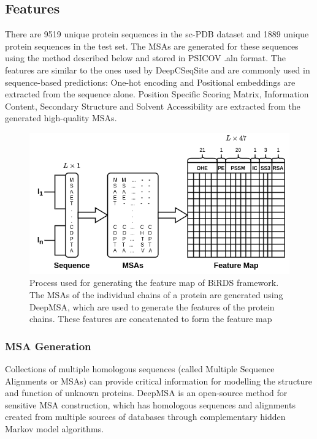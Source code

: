 \documentclass[journal=jcisd8,manuscript=article]{achemso}
\begin{document}
\subsection{Features}
\quad There are 9519 unique protein sequences in the sc-PDB\cite{desaphy2015sc} dataset and 1889 unique protein sequences in the test set. The MSAs are generated for these sequences using the method described below and stored in PSICOV \cite{jones2012psicov} .aln format. The features are similar to the ones used by DeepCSeqSite\cite{cui2019predicting} and are commonly used in sequence-based predictions: One-hot encoding and Positional embeddings are extracted from the sequence alone. Position Specific Scoring Matrix, Information Content, Secondary Structure and Solvent Accessibility are extracted from the generated high-quality MSAs.

\begin{figure}
    \centering
    \noindent\includegraphics[scale=0.6]{feature_map}
    \caption{\centering Process used for generating the feature map of BiRDS framework. The MSAs of the individual chains of a protein are generated using DeepMSA, which are used to generate the features of the protein chains. These features are concatenated to form the feature map}
    \label{fig:feature_map}
\end{figure}

\subsubsection{MSA Generation}
\quad Collections of multiple homologous sequences (called Multiple Sequence Alignments or MSAs) can provide critical information for modelling the structure and function of unknown proteins. DeepMSA \cite{zhang2020deepmsa} is an open-source method for sensitive MSA construction, which has homologous sequences and alignments created from multiple sources of databases through complementary hidden Markov model algorithms.
\end{document}
